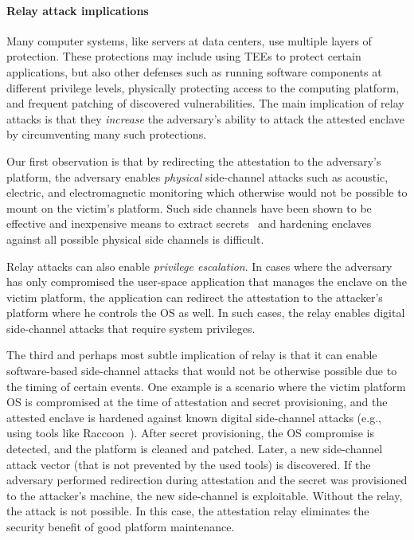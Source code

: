 \documentclass[letterpaper,twocolumn,10pt]{article}
\begin{document}
\paragraph{Relay attack implications}

Many computer systems, like servers at data centers, use multiple layers of protection. These protections may include using TEEs to protect certain applications, but also other defenses such as running software components at different privilege levels, physically protecting access to the computing platform, and frequent patching of discovered vulnerabilities. The main implication of relay attacks is that they \emph{increase} the adversary's ability to attack the attested enclave by circumventing many such protections.

Our first observation is that by redirecting the attestation to the adversary's platform, the adversary enables \emph{physical} side-channel attacks such as acoustic, electric, and electromagnetic monitoring which otherwise would not be possible to mount on the victim's platform. Such side channels have been shown to be effective and inexpensive means to extract secrets~\cite{genkin2016physical} and hardening enclaves against all possible physical side channels is difficult. 

Relay attacks can also enable \emph{privilege escalation}. In cases where the adversary has only compromised the user-space application that manages the enclave on the victim platform, the application can redirect the attestation to the attacker's platform where he controls the OS as well. In such cases, the relay enables digital side-channel attacks that require system privileges.

The third and perhaps most subtle implication of relay is that it can enable software-based side-channel attacks that would not be otherwise possible due to the timing of certain events. One example is a scenario where the victim platform OS is compromised at the time of attestation and secret provisioning, and the attested enclave is hardened against known digital side-channel attacks (e.g., using tools like Raccoon~\cite{raccoon}). After secret provisioning, the OS compromise is detected, and the platform is cleaned and patched. Later, a new side-channel attack vector (that is not prevented by the used tools) is discovered. If the adversary performed redirection during attestation and the secret was provisioned to the attacker's machine, the new side-channel is exploitable. Without the relay, the attack is not possible. In this case, the attestation relay eliminates the security benefit of good platform maintenance.
\end{document}
